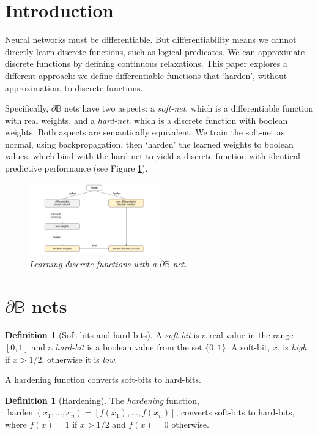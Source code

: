 \documentclass{article}
\theoremstyle{plain}
\theoremstyle{definition}
\newtheorem{definition}[theorem]{Definition}
\theoremstyle{remark}
\begin{document}
\vspace{-0.96cm}

\section{Introduction}

Neural networks must be differentiable. But differentiability means we cannot directly learn discrete functions, such as logical predicates. We can approximate discrete functions by defining continuous relaxations. This paper explores a different approach: we define differentiable functions that `harden', without approximation, to discrete functions. 

Specifically, $\partial \mathbb{B}$ nets have two aspects: a {\em soft-net}, which is a differentiable function with real weights, and a {\em hard-net}, which is a discrete function with boolean weights. Both aspects are semantically equivalent. We train the soft-net as normal, using backpropagation, then `harden' the learned weights to boolean values, which bind with the hard-net to yield a discrete function with identical predictive performance (see Figure \ref{fig:main-idea}).

\begin{figure}[h]
	\centering
	\includegraphics[trim=80pt 25pt 40pt 10pt, clip, width=0.5\textwidth]{../db-net.png}
	\caption{{\em Learning discrete functions with a $\partial\mathbb{B}$ net.}}
	\label{fig:main-idea}
\end{figure}

\section{$\partial\mathbb{B}$ nets}\label{sec:db-nets}

\begin{definition}[Soft-bits and hard-bits]
	A {\em soft-bit} is a real value in the range $[0,1]$ and a {\em hard-bit} is a boolean value from the set $\{0,1\}$. A soft-bit, $x$, is {\em high} if $x>1/2$, otherwise it is {\em low}.
\end{definition}
A hardening function converts soft-bits to hard-bits.
\begin{definition}[Hardening]
	The {\em hardening} function, $\operatorname{harden}(x_{1}, \dots, x_{n}) = [f(x_{1}), \dots, f(x_{n})]$, converts soft-bits to hard-bits, where $f(x)=1$ if $x > 1/2$ and $f(x)=0$ otherwise.
\end{definition}
\end{document}
